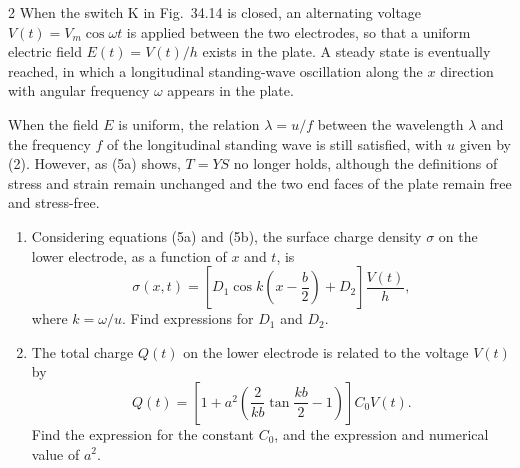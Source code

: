 \begin{problem}{2}
When the switch K in Fig.~34.14 is closed, an alternating voltage $V(t)=V_m\cos\omega t$ is applied between the two electrodes, so that a uniform electric field $E(t)=V(t)/h$ exists in the plate. A steady state is eventually reached, in which a longitudinal standing-wave oscillation along the $x$ direction with angular frequency $\omega$ appears in the plate.

When the field $E$ is uniform, the relation $\lambda=u/f$ between the wavelength $\lambda$ and the frequency $f$ of the longitudinal standing wave is still satisfied, with $u$ given by (2). However, as (5a) shows, $T=YS$ no longer holds, although the definitions of stress and strain remain unchanged and the two end faces of the plate remain free and stress-free.

\begin{enumerate}[label=(\alph*),leftmargin=2.2em,itemsep=1pt,start=5]
\item Considering equations (5a) and (5b), the surface charge density $\sigma$ on the lower electrode, as a function of $x$ and $t$, is
\[
\sigma(x,t)=\left[D_1\cos k\left(x-\frac{b}{2}\right)+D_2\right]\frac{V(t)}{h},
\]
where $k=\omega/u$. Find expressions for $D_1$ and $D_2$.
\item The total charge $Q(t)$ on the lower electrode is related to the voltage $V(t)$ by
\begin{equation}
Q(t)=\left[1+a^2\left(\frac{2}{kb}\tan\frac{kb}{2}-1\right)\right]C_0V(t). \tag{6}
\end{equation}
Find the expression for the constant $C_0$, and the expression and numerical value of $a^2$.
\end{enumerate}

\end{problem}

